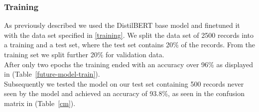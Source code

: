 \subsubsection{Training}
As previously described we used the DistilBERT base model and finetuned it with the data set specified in \ref{training}.
We split the data set of 2500 records into a training and a test set, where the test set contains 20\% of the records.
From the training set we split further 20\% for validation data.
\\
After only two epochs the training ended with an accuracy over 96\% as displayed in (Table~\ref{future-model-train}).
\\
Subsequently we tested the model on our test set containing 500 records never seen by the model and achieved an accuracy of 93.8\%, as seen in the confusion matrix in (Table~\ref{cm}).

\begin{table}
\setlength\tabcolsep{2pt} %
\footnotesize\centering
\captionsetup{size=footnotesize}
\resizebox{\columnwidth}{!}{%
\begin{tabular}{
    ccccc}

\hline

\textbf{Epoch} & \textbf{Train Loss} & \textbf{Train Accuracy} & \textbf{Val. Loss} & \textbf{Val. Accuracy}\\
\hline
0 & 0.3816 & 0.8594 & 0.1547 & 0.9475 \\
1 & 0.1142 & 0.9613 & 0.1272 & 0.9625 \\
\hline
\end{tabular}}
\caption{\label{future-model-train}
Training Results
}
\end{table}

